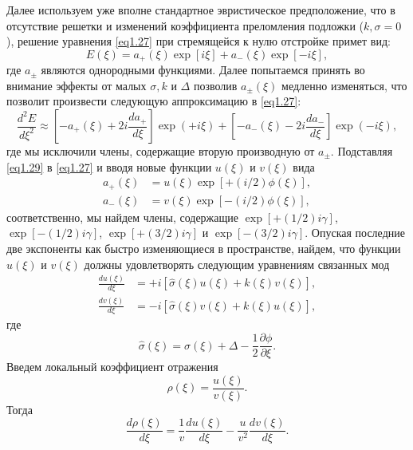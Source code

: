 Далее используем уже вполне стандартное эвристическое предположение, что в отсутствие решетки и изменений коэффициента преломления подложки ($k, \sigma=0$), решение уравнения \eqref{eq1.27} при стремящейся к нулю отстройке примет вид:
\begin{equation}\label{eq1.28}
    E(\xi)=a_+(\xi)\exp[i\xi] + a_-(\xi)\exp[-i\xi],
\end{equation}
где $a_\pm$ являются однородными функциями. Далее попытаемся принять во внимание эффекты от малых $\sigma, k$ и $\Delta$ позволив $a_\pm(\xi)$ медленно изменяться, что позволит произвести следующую аппроксимацию в \eqref{eq1.27}:
\begin{equation}\label{eq1.29}
    \frac{d^2E}{d\xi^2} \approx \left[-a_+(\xi) + 2i\frac{da_+}{d\xi}\right]\exp(+i\xi)+\left[-a_-(\xi) - 2i\frac{da_-}{d\xi}\right]\exp(-i\xi),
\end{equation}
где мы исключили члены, содержащие вторую производную от $a_\pm$. Подставляя \eqref{eq1.29} в \eqref{eq1.27} и вводя новые функции $u(\xi)$ и $v(\xi)$ вида
\begin{equation}\label{eq1.30}
\begin{split}
    a_+(\xi)&=u(\xi)\exp\left[+(i/2) \phi(\xi)\right],\\
    a_-(\xi)&=v(\xi)\exp\left[-(i/2) \phi(\xi)\right],
\end{split}
\end{equation}
соответственно, мы найдем члены, содержащие $\exp[+(1/2)i\gamma]$, $\exp[-(1/2)i\gamma]$, $\exp[+(3/2)i\gamma]$ и $\exp[-(3/2)i\gamma]$.
Опуская последние две экспоненты как быстро изменяющиеся в пространстве, найдем, что функции $u(\xi)$ и $v(\xi)$ должны удовлетворять следующим уравнениям связанных мод
\begin{equation}\label{eq1.31}
\begin{split}
    \frac{du(\xi)}{d\xi}&=+i[\hat{\sigma}(\xi)u(\xi)+k(\xi)v(\xi)],\\
    \frac{dv(\xi)}{d\xi}&=-i[\hat{\sigma}(\xi)v(\xi)+k(\xi)u(\xi)],
\end{split}
\end{equation}
где
\begin{equation}\label{eq1.32}
    \hat{\sigma}(\xi)=\sigma(\xi)+\Delta-\frac{1}{2}\frac{\partial\phi}{\partial\xi}.
\end{equation}
Введем локальный коэффициент отражения
\begin{equation}\label{eq1.33}
    \rho(\xi)=\frac{u(\xi)}{v(\xi)}.
\end{equation}
Тогда
\begin{equation}\label{eq1.34}
    \frac{d\rho(\xi)}{d\xi}=\frac{1}{v}\frac{du(\xi)}{d\xi}-\frac{u}{v^2}\frac{dv(\xi)}{d\xi}.
\end{equation}
